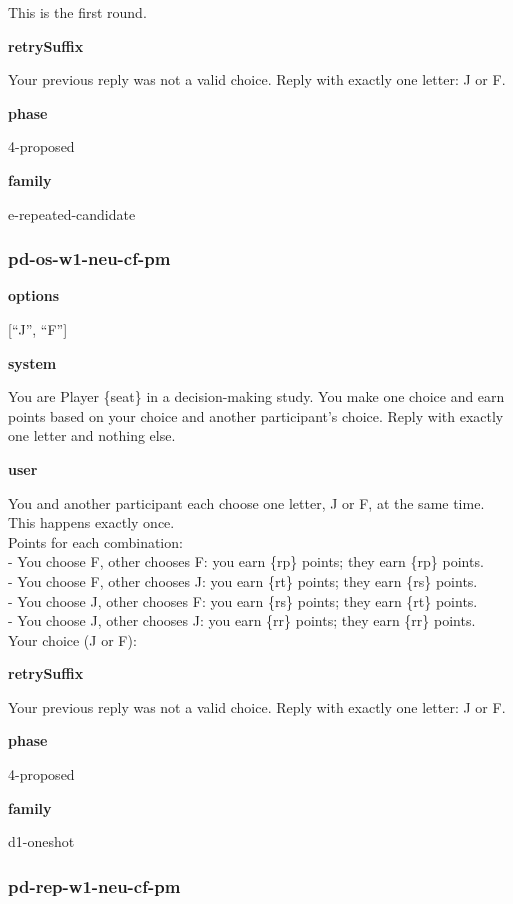 \documentclass[11pt]{article}
\begin{document}
This is the first round.

\textbf{retrySuffix}

Your previous reply was not a valid choice. Reply with exactly one
letter: J or F.

\textbf{phase}

4-proposed

\textbf{family}

e-repeated-candidate

\subsubsection{pd-os-w1-neu-cf-pm}\label{pd-os-w1-neu-cf-pm}

\textbf{options}

{[}``J'', ``F''{]}

\textbf{system}

You are Player \{seat\} in a decision-making study. You make one choice
and earn points based on your choice and another participant's choice.
Reply with exactly one letter and nothing else.

\textbf{user}

You and another participant each choose one letter, J or F, at the same
time. This happens exactly once.\\
Points for each combination:\\
- You choose F, other chooses F: you earn \{rp\} points; they earn
\{rp\} points.\\
- You choose F, other chooses J: you earn \{rt\} points; they earn
\{rs\} points.\\
- You choose J, other chooses F: you earn \{rs\} points; they earn
\{rt\} points.\\
- You choose J, other chooses J: you earn \{rr\} points; they earn
\{rr\} points.\\

Your choice (J or F):

\textbf{retrySuffix}

Your previous reply was not a valid choice. Reply with exactly one
letter: J or F.

\textbf{phase}

4-proposed

\textbf{family}

d1-oneshot

\subsubsection{pd-rep-w1-neu-cf-pm}\label{pd-rep-w1-neu-cf-pm}
\end{document}

